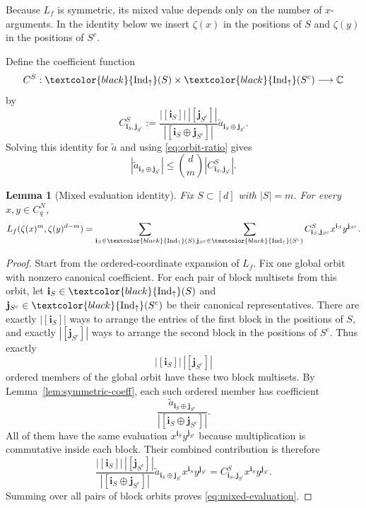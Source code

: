 \documentclass[11pt,a4paper]{article}
\numberwithin{equation}{section}
\theoremstyle{cleanplain}
\newtheorem{lemma}[lemma]{Lemma}
\theoremstyle{cleandefinition}
\theoremstyle{cleanremark}
\newcommand{\C}{\mathbb C}
\newcommand{\Indup}{\textcolor{black}{\operatorname{Ind}_{\uparrow}}}
\begin{document}
{Because $L_f$ is symmetric, its mixed value depends only on the number of
$x$-arguments.  In the identity below we insert $\zeta(x)$ in the positions
of $S$ and $\zeta(y)$ in the positions of $S^c$.

Define the coefficient function
\[
 C^S:\Indup(S)\times\Indup(S^c)\longrightarrow\C
\]
by
\begin{equation}\label{eq:CuvS}
 C^S_{\mathbf i_S,\mathbf j_{S^c}}
 :=\frac{|[\mathbf i_S]|\,|[\mathbf j_{S^c}]|}
 {|[\mathbf i_S\oplus\mathbf j_{S^c}]|}
 \widetilde a_{\mathbf i_S\oplus\mathbf j_{S^c}}.
\end{equation}
Solving this identity for $\widetilde a$ and using
\eqref{eq:orbit-ratio} gives
\begin{equation}\label{eq:atilde-C-bound}
 |\widetilde a_{\mathbf i_S\oplus\mathbf j_{S^c}}|
 \leq\binom dm|C^S_{\mathbf i_S,\mathbf j_{S^c}}|.
\end{equation}

\begin{lemma}[Mixed evaluation identity]\label{lem:mixed-evaluation}
Fix $S\subset[d]$ with $|S|=m$.  For every $x,y\in C_q^N$,
\begin{equation}\label{eq:mixed-evaluation}
 L_f(\zeta(x)^m,\zeta(y)^{d-m})
 =\sum_{\mathbf i_S\in\Indup(S)}
  \sum_{\mathbf j_{S^c}\in\Indup(S^c)}
 C^S_{\mathbf i_S,\mathbf j_{S^c}}x^{\mathbf i_S}y^{\mathbf j_{S^c}}.
\end{equation}
\end{lemma}

\begin{proof}
Start from the ordered-coordinate expansion of $L_f$.  Fix one global orbit
with nonzero canonical coefficient.  For each pair of block multisets from
this orbit, let $\mathbf i_S\in\Indup(S)$ and
$\mathbf j_{S^c}\in\Indup(S^c)$ be their canonical representatives.  There
are exactly $|[\mathbf i_S]|$ ways to
arrange the entries of the first block in the positions of $S$, and exactly
$|[\mathbf j_{S^c}]|$ ways to arrange the second block in the positions of $S^c$.
Thus exactly
\[
 |[\mathbf i_S]|\,|[\mathbf j_{S^c}]|
\]
ordered members of the global orbit have these two block multisets.
By Lemma~\ref{lem:symmetric-coeff}, each such ordered member has coefficient
\[
 \frac{\widetilde a_{\mathbf i_S\oplus\mathbf j_{S^c}}}
 {|[\mathbf i_S\oplus\mathbf j_{S^c}]|}.
\]
All of them have the same evaluation
$x^{\mathbf i_S}y^{\mathbf j_{S^c}}$ because multiplication is commutative inside
each block.  Their combined contribution is therefore
\[
 \frac{|[\mathbf i_S]|\,|[\mathbf j_{S^c}]|}
 {|[\mathbf i_S\oplus\mathbf j_{S^c}]|}
 \widetilde a_{\mathbf i_S\oplus\mathbf j_{S^c}}
 x^{\mathbf i_S}y^{\mathbf j_{S^c}}
 =C^S_{\mathbf i_S,\mathbf j_{S^c}}x^{\mathbf i_S}y^{\mathbf j_{S^c}}.
\]
Summing over all pairs of block orbits proves
\eqref{eq:mixed-evaluation}.
\end{proof}

}
\end{document}
